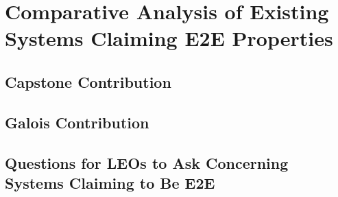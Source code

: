 \chapter{Comparative Analysis of Existing Systems Claiming E2E Properties}

\section{Capstone Contribution}

\section{Galois Contribution}

\section{Questions for LEOs to Ask Concerning Systems Claiming to Be E2E}
